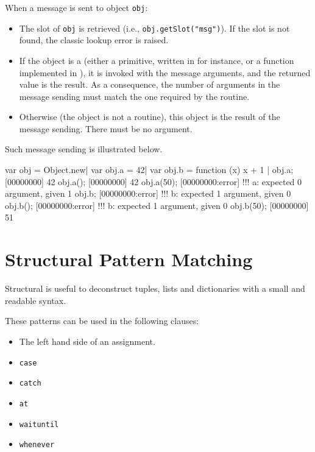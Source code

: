 When a message  is sent to object \lstinline|obj|:

\begin{itemize}
\item The  slot of \lstinline|obj| is retrieved (i.e.,
  \lstinline|obj.getSlot("msg")|). If the slot is not found, the
  classic lookup error is raised.
\item If the object is a  (either a primitive, written in
  \Cxx for instance, or a function implemented in \us), it is invoked
  with the message arguments, and the returned value is the result. As
  a consequence, the number of arguments in the message sending must
  match the one required by the routine.
\item Otherwise (the object is not a routine), this object is the
  result of the message sending. There must be no argument.
\end{itemize}

Such message sending is illustrated below.

\begin{urbiscript}
var obj = Object.new|
var obj.a = 42|
var obj.b = function (x) { x + 1 }|
obj.a;
[00000000] 42
obj.a();
[00000000] 42
obj.a(50);
[00000000:error] !!! a: expected 0 argument, given 1
obj.b;
[00000000:error] !!! b: expected 1 argument, given 0
obj.b();
[00000000:error] !!! b: expected 1 argument, given 0
obj.b(50);
[00000000] 51
\end{urbiscript}

\section{Structural Pattern Matching}
\label{sec:lang:pattern}

Structural  is useful to deconstruct tuples, lists and
dictionaries with a small and readable syntax.

These patterns can be used in the following clauses:
\begin{itemize}
\item The left hand side of an assignment.
\item \lstinline{case}
\item \lstinline{catch}
\item \lstinline{at}
\item \lstinline{waituntil}
\item \lstinline{whenever}
\end{itemize}

